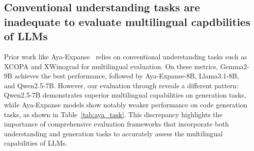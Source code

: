 \subsection{Conventional understanding tasks are inadequate to evaluate multilingual capdbilities of LLMs}
Prior work like Aya-Expanse~\cite{dang2024aya} relies on conventional understanding tasks such as XCOPA and XWinograd for multilingual evaluation.
On these metrics, Gemma2-9B achieves the best performance, followed by Aya-Expanse-8B, Llama3.1-8B, and Qwen2.5-7B.
However, our evaluation through \name reveals a different pattern: Qwen2.5-7B demonstrates superior multilingual capabilities on generation tasks, while Aya-Expanse models show notably weaker performance on code generation tasks, as shown in Table~\ref{tab:aya_task}.
This discrepancy highlights the importance of comprehensive evaluation frameworks that incorporate both understanding and generation tasks to accurately assess the multilingual capabilities of LLMs.

